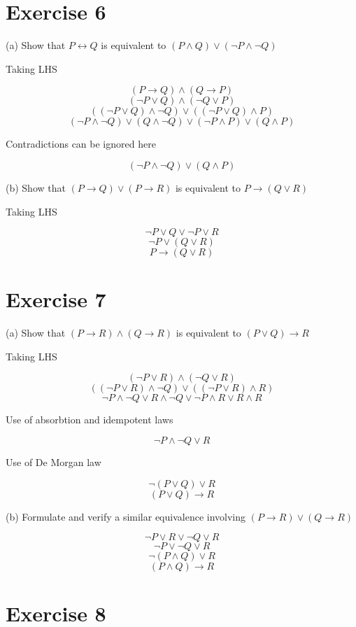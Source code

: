 \documentclass[11pt]{article}
\newcommand{\then}{\rightarrow}
\newcommand{\bicond}{\leftrightarrow}
\begin{document}
\section*{Exercise 6}

\noindent (a) Show that $P \bicond Q$ is equivalent to 
$(P \wedge Q) \vee (\neg P \wedge \neg Q)$

Taking LHS

$$(P \then Q) \wedge (Q \then P)$$
$$(\neg P \vee Q) \wedge (\neg Q \vee P)$$
$$((\neg P \vee Q) \wedge \neg Q) \vee ((\neg P \vee Q) \wedge P)$$
$$(\neg P \wedge \neg Q) \vee (Q \wedge \neg Q) \vee (\neg P \wedge P) \vee (Q \wedge P)$$

Contradictions can be ignored here

$$(\neg P \wedge \neg Q) \vee (Q \wedge P)$$

\noindent (b) Show that $(P \then Q) \vee (P \then R)$ is equivalent to 
$P \then (Q \vee R)$

Taking LHS

$$\neg P \vee Q \vee \neg P \vee R$$
$$\neg P \vee (Q \vee R)$$
$$P \then (Q \vee R)$$

\section*{Exercise 7}

\noindent (a) Show that $(P \then R) \wedge (Q \then R)$ is equivalent to 
$(P \vee Q) \then R$

Taking LHS

$$(\neg P \vee R) \wedge (\neg Q \vee R)$$
$$((\neg P \vee R) \wedge \neg Q) \vee ((\neg P \vee R) \wedge R)$$
$$\neg P \wedge \neg Q \vee R \wedge \neg Q \vee \neg P \wedge R \vee R \wedge R$$

Use of absorbtion and idempotent laws 

$$\neg P \wedge \neg Q \vee R$$

Use of De Morgan law 

$$\neg (P \vee Q) \vee R$$
$$(P \vee Q) \then R$$

\noindent (b) Formulate and verify a similar equivalence involving 
$(P \then R) \vee (Q \then R)$

$$\neg P \vee R \vee \neg Q \vee R$$
$$\neg P \vee \neg Q \vee R$$
$$\neg (P \wedge Q) \vee R$$
$$(P \wedge Q) \then R$$

\section*{Exercise 8}
\end{document}
